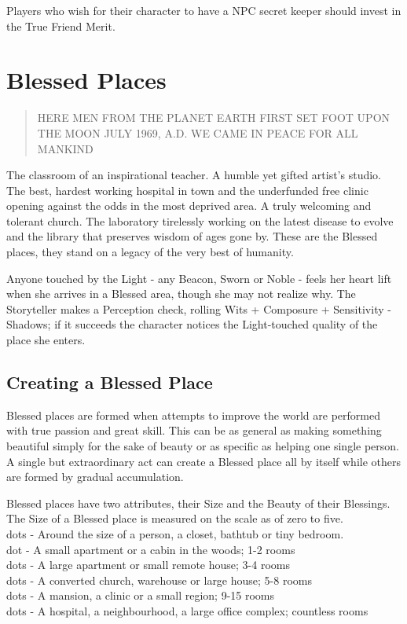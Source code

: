 Players who wish for their character to have a NPC secret keeper should invest in the True Friend Merit. 



\section*{Blessed Places}

\begin{quote}
HERE MEN FROM THE PLANET EARTH FIRST SET FOOT UPON THE MOON
JULY 1969, A.D.
WE CAME IN PEACE FOR ALL MANKIND
 \end{quote}
 
The classroom of an inspirational teacher. A humble yet gifted artist's studio. The best, hardest working hospital in town and the underfunded free clinic opening against the odds in the most deprived area. A truly welcoming and tolerant church. The laboratory tirelessly working on the latest disease to evolve and the library that preserves wisdom of ages gone by. These are the Blessed places, they stand on a legacy of the very best of humanity.
 
Anyone touched by the Light - any Beacon, Sworn or Noble - feels her heart lift when she arrives in a Blessed area, though she may not realize why. The Storyteller makes a Perception check, rolling Wits + Composure + Sensitivity - Shadows; if it succeeds the character notices the Light-touched quality of the place she enters.
 
\subsection*{Creating a Blessed Place}
Blessed places are formed when attempts to improve the world are performed with true passion and great skill. This can be as general as making something beautiful simply for the sake of beauty or as specific as helping one single person. A single but extraordinary act can create a Blessed place all by itself while others are formed by gradual accumulation.

Blessed places have two attributes, their Size and the Beauty of their Blessings. The Size of a Blessed place is measured on the scale as of zero to five. \\

 dots - Around the size of a person, a closet, bathtub or tiny bedroom.\\
 dot - A small apartment or a cabin in the woods; 1-2 rooms\\
 dots - A large apartment or small remote house; 3-4 rooms\\
 dots - A converted church, warehouse or large house; 5-8 rooms\\
 dots - A mansion, a clinic or a small region; 9-15 rooms\\
 dots - A hospital, a neighbourhood, a large office complex; countless rooms\\


